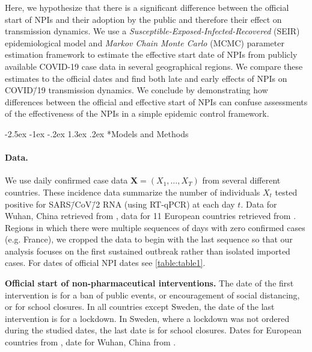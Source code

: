 \documentclass[12pt]{extarticle}
\makeatletter
\renewcommand\section{\@startsection {section}{1}{\z@}%
     {-2.5ex \@plus -1ex \@minus -.2ex}%
     {1.3ex \@plus.2ex}%
    {\Large\bfseries}}
\let\vec\mathbf
\makeatother
\begin{document}
Here, we hypothesize that there is a significant difference between the official start of NPIs and their adoption by the public and therefore their effect on transmission dynamics.
We use a \textit{Susceptible-Exposed-Infected-Recovered} (SEIR) epidemiological model and \textit{Markov Chain Monte Carlo} (MCMC) parameter estimation framework to estimate the effective start date of NPIs from publicly available COVID-19 case data in several geographical regions.
We compare these estimates to the official dates and find both late and early effects of NPIs on COVID\=/19 transmission dynamics.
We conclude by demonstrating how differences between the official and effective start of NPIs can confuse assessments of the effectiveness of the NPIs in a simple epidemic control framework. %



\section*{Models and Methods}



\paragraph*{Data.} 
We use daily confirmed case data $\vec{X}=(X_1, \ldots, X_T)$ from several different countries. These incidence data summarize the number of individuals $X_t$ tested positive for SARS\=/CoV\=/2 RNA (using RT-qPCR) at each day $t$.
Data for Wuhan, China retrieved from \citet{Pei2020}, data for 11 European countries retrieved from \citet{Flaxman2020}. 
Regions in which there were multiple sequences of days with zero confirmed cases (e.g. France), we cropped the data to begin with the last sequence so that our analysis focuses on the first sustained outbreak rather than isolated imported cases. 
For dates of official NPI dates see \autoref{table:table1}.


 
\begin{table}[h]
\centering
{}
\caption{
\textbf{Official start of non-pharmaceutical interventions.}
The date of the first intervention is for a ban of public events, or encouragement of social distancing, or for school closures.
In all countries except Sweden, the date of the last intervention is for a lockdown. In Sweden, where a lockdown was not ordered during the studied dates, the last date is for school closures. Dates for European countries from \citet{Flaxman2020}, date for Wuhan, China from \citet{Pei2020}.
}
\label{table:table1}
\end{table}
\end{document}
